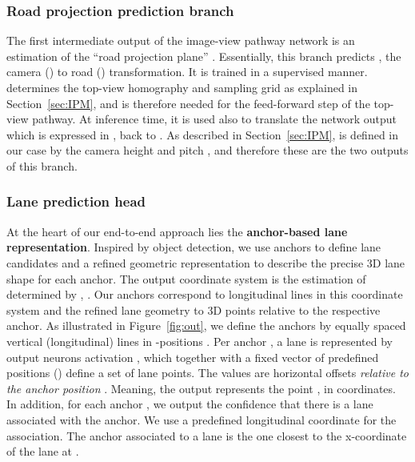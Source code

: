 \documentclass[10pt,twocolumn,letterpaper]{article}
\begin{document}
\subsubsection{Road projection prediction branch}
\label{horizon_estimation}
The first intermediate output of the image-view pathway network is an estimation of  the ``road projection plane'' . Essentially, this branch predicts , the camera () to road () transformation. It is trained in a supervised manner.  determines the top-view homography  and sampling grid  as explained in Section~\ref{sec:IPM}, and is therefore needed for the feed-forward step of the top-view pathway. At inference time, it is used also to translate the network output which is expressed in , back to . As described in Section~\ref{sec:IPM},  is defined in our case by the camera height  and pitch , and therefore these are the two outputs of this branch.


\subsubsection{Lane prediction head}

At the heart of our end-to-end approach lies the \textbf{anchor-based lane representation}. Inspired by object detection, we use anchors to define lane candidates and a refined geometric representation to describe the precise 3D lane shape for each anchor. The output coordinate system is the estimation of  determined by , . Our anchors correspond to longitudinal lines in this coordinate system and the refined lane geometry to 3D points relative to the respective anchor. As illustrated in Figure~\ref{fig:out}, we define the anchors by equally spaced vertical (longitudinal) lines in -positions . Per anchor , a  lane is represented by  output neurons activation , which together with a fixed vector of  predefined  positions () define a set of  lane points. The values  are horizontal offsets \emph{relative to the anchor position }. Meaning, the output  represents the point , in  coordinates. In addition, for each anchor , we output the confidence  that there is a lane associated with the anchor. We use a predefined longitudinal coordinate  for the association. The anchor  associated to a lane is the one closest to the x-coordinate of the lane at .
\end{document}
